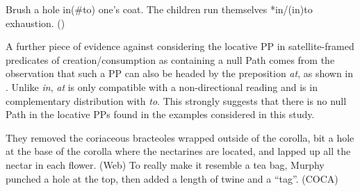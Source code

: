 \documentclass[output=paper,colorlinks,citecolor=brown]{langscibook}
\begin{document}
\ea \label{threecontrast} \ea \label{threeone} Brush a hole in($\#$to) one's coat.
\ex \label{threetwo} The children run themselves *in/(in)to exhaustion. \hfill (\citealt[281]{Iwata2020})
\z \z

\noindent A further piece of evidence against considering the locative PP in satellite-framed predicates of creation/consumption as containing a null Path comes from the observation that such a PP can also be headed by the preposition \textit{at}, as shown in . Unlike \textit{in}, \textit{at} is only compatible with a non-directional reading and is in complementary distribution with \textit{to}. This strongly suggests that there is no null Path in the locative PPs found in the examples considered in this study.

\ea \label{bitpunchat} \ea They removed the coriaceous bracteoles wrapped outside of the corolla, bit a hole at the base of the corolla where the nectarines are located, and lapped up all the nectar in each flower. \hfill (Web)
\ex To really make it resemble a tea bag, Murphy punched a hole at the top, then added a length of twine and a ``tag''. \hfill (COCA) \z \z
\end{document}
